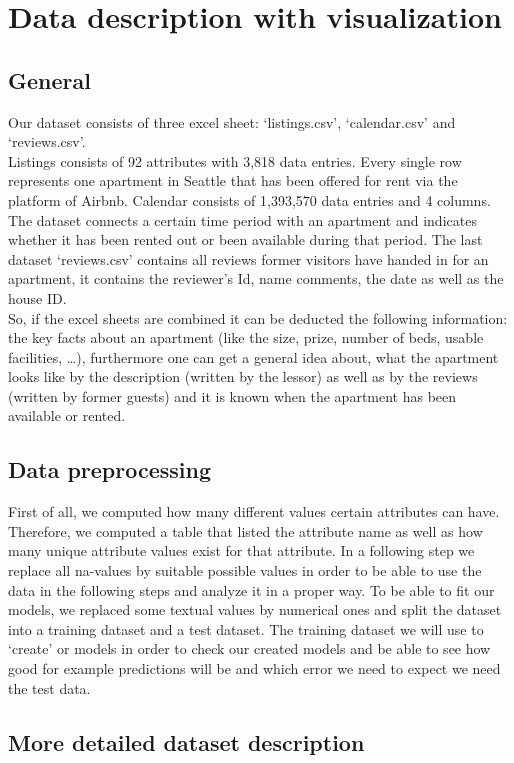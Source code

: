 \documentclass[journal]{IEEEtran}
\begin{document}
\section{Data description with visualization}


\subsection {General}
Our dataset consists of three excel sheet: ‘listings.csv’, ‘calendar.csv’ and ‘reviews.csv’.\\
Listings consists of 92 attributes with 3,818 data entries. Every single row represents one apartment in Seattle that has been offered for rent via the platform of Airbnb. Calendar consists of 1,393,570 data entries and 4 columns. The dataset connects a certain time period with an apartment and indicates whether it has been rented out or been available during that period. The last dataset ‘reviews.csv’ contains all reviews former visitors have handed in for an apartment, it contains the reviewer’s Id, name comments, the date as well as the house ID.\\So, if the excel sheets are combined it can be deducted the following information: the key facts about an apartment (like the size, prize, number of beds, usable facilities, …), furthermore one can get a general idea about, what the apartment looks like by the description (written by the lessor) as well as by the reviews (written by former guests) and it is known when the apartment has been available or rented.

\subsection {Data preprocessing}

First of all, we computed how many different values certain attributes can have. Therefore, we computed a table that listed the attribute name as well as how many unique attribute values exist for that attribute.
In a following step we replace all na-values by suitable possible values in order to be able to use the data in the following steps and analyze it in a proper way. To be able to fit our models, we replaced some textual values by numerical ones and split the dataset into a training dataset and a test dataset. The training dataset we will use to ‘create’ or models in order to check our created models and be able to see how good for example predictions will be and which error we need to expect we need the test data.
\subsection {More detailed dataset description}
\end{document}
